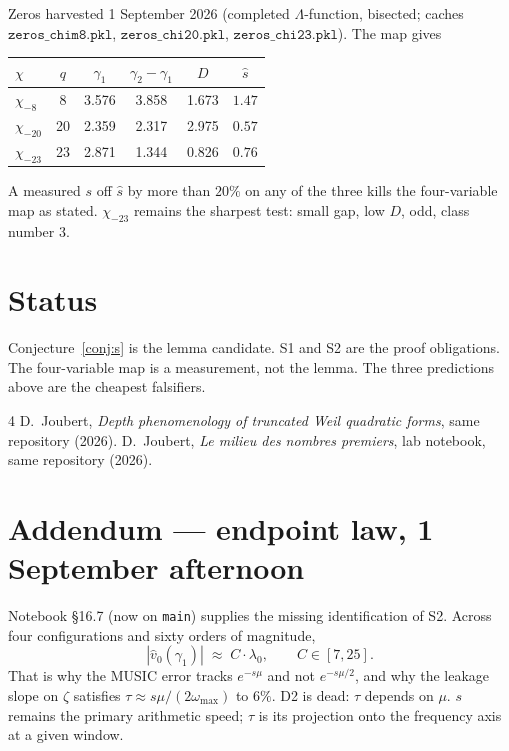 \documentclass[10pt]{article}
\begin{document}
Zeros harvested 1 September 2026 (completed $\Lambda$-function,
bisected; caches $\mathtt{zeros\_chim8.pkl}$,
$\mathtt{zeros\_chi20.pkl}$, $\mathtt{zeros\_chi23.pkl}$). The map
gives
\begin{center}\small
\begin{tabular}{lccccc}
\toprule
$\chi$ & $q$ & $\gamma_1$ & $\gamma_2-\gamma_1$ & $D$ & $\hat s$ \\
\midrule
$\chi_{-8}$  & 8  & 3.576 & 3.858 & 1.673 & $1.47$ \\
$\chi_{-20}$ & 20 & 2.359 & 2.317 & 2.975 & $0.57$ \\
$\chi_{-23}$ & 23 & 2.871 & 1.344 & 0.826 & $0.76$ \\
\bottomrule
\end{tabular}
\end{center}
A measured $s$ off $\hat s$ by more than $20\%$ on any of the three
kills the four-variable map as stated. $\chi_{-23}$ remains the sharpest
test: small gap, low $D$, odd, class number $3$.

\section{Status}

Conjecture~\ref{conj:s} is the lemma candidate. S1 and S2 are the
proof obligations. The four-variable map is a measurement, not the
lemma. The three predictions above are the cheapest falsifiers.

\begin{thebibliography}{4}\small
{} D.~Joubert, \emph{Depth phenomenology of truncated Weil
quadratic forms}, same repository (2026).
 D.~Joubert, \emph{Le milieu des nombres premiers}, lab
notebook, same repository (2026).
\end{thebibliography}

\section*{Addendum --- endpoint law, 1 September afternoon}

Notebook \S16.7 (now on \texttt{main}) supplies the missing
identification of S2. Across four configurations and sixty orders of
magnitude,
\[
|\hat v_0(\gamma_1)| \;\approx\; C\cdot\lambda_0,
\qquad C\in[7,25].
\]
That is why the MUSIC error tracks $e^{-s\mu}$ and not $e^{-s\mu/2}$,
and why the leakage slope on $\zeta$ satisfies
$\tau\approx s\mu/(2\omega_{\max})$ to $6\%$. D2 is dead: $\tau$
depends on $\mu$. $s$ remains the primary arithmetic speed; $\tau$ is
its projection onto the frequency axis at a given window.
\end{document}
